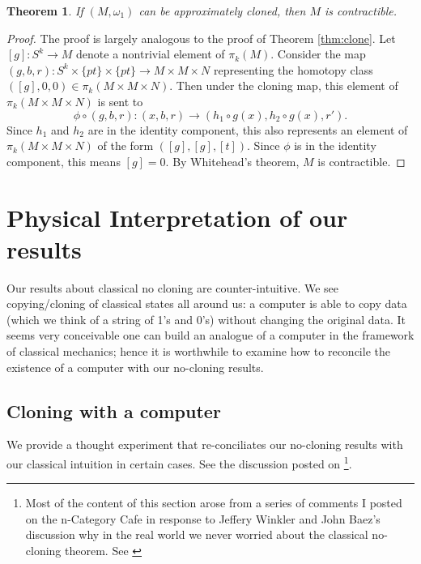 \documentclass[jmp,amsmath,amssymb]{revtex4-1}
\theoremstyle{plain}
\newtheorem{theorem}{Theorem}[section]
\begin{document}
\begin{theorem} \label{thm:approximately clone}
If $(M,\omega_1)$ can be approximately cloned, then $M$ is contractible.
\end{theorem}

\begin{proof}
    The proof is largely analogous to the proof of Theorem \ref{thm:clone}. Let $[g]: S^k \rightarrow M$ denote a nontrivial element of $\pi_k(M)$. Consider the map $(g,b,r):S^k\times \{pt\}\times \{pt\} \rightarrow M\times M\times N$ representing the homotopy class $([g],0,0) \in \pi_k(M\times M \times N)$. Then under the cloning map, this element of $\pi_k(M\times M \times N)$ is sent to
    \[
    \phi \circ (g,b,r): (x,b,r) \rightarrow (h_1\circ g(x), h_2 \circ g(x), r').
    \]
    Since $h_1$ and $h_2$ are in the identity component, this also represents an element of $\pi_k(M\times M \times N)$ of the form $([g],[g],[t])$. Since $\phi$ is in the identity component, this means $[g]=0$. By Whitehead's theorem, $M$ is contractible.
\end{proof}

\section{Physical Interpretation of our results} \label{physical interpretation of our results}
Our results about classical no cloning are counter-intuitive. We see copying/cloning of classical states all around us: a computer is able to copy data (which we think of a string of 1's and 0's) without changing the original data. It seems very conceivable one can build an analogue of a computer in the framework of classical mechanics; hence it is worthwhile to examine how to reconcile the existence of a computer with our no-cloning results.

\subsection{Cloning with a computer}

We provide a thought experiment that re-conciliates our no-cloning results with our classical intuition in certain cases. See the discussion posted on \cite{Baez_2023} \footnote{Most of the content of this section arose from a series of comments I posted on the n-Category Cafe in response to Jeffery Winkler and John Baez's discussion why in the real world we never worried about the classical no-cloning theorem. See \cite{Baez_2023}}.
\end{document}
